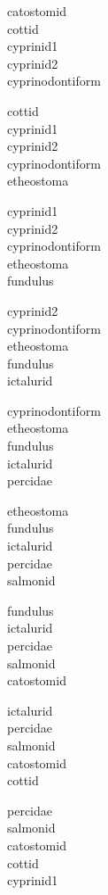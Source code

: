 \documentclass[11pt]{article}
\begin{document}
\thispagestyle{empty}

\begin{multicols*}{3}
	\raggedcolumns
catostomid \\
cottid \\
cyprinid1 \\
cyprinid2 \\
cyprinodontiform \bigskip

cottid \\
cyprinid1 \\
cyprinid2 \\
cyprinodontiform \\
etheostoma \bigskip

cyprinid1 \\
cyprinid2 \\
cyprinodontiform \\
etheostoma \\
fundulus \bigskip

cyprinid2 \\
cyprinodontiform \\
etheostoma \\
fundulus \\
ictalurid \bigskip

cyprinodontiform \\
etheostoma \\
fundulus \\
ictalurid \\
percidae \bigskip

etheostoma \\
fundulus \\
ictalurid \\
percidae \\
salmonid \bigskip

fundulus \\
ictalurid \\
percidae \\
salmonid\\
catostomid 

\columnbreak

ictalurid \\
percidae \\
salmonid\\
catostomid \\
cottid \bigskip

percidae \\
salmonid\\
catostomid \\
cottid \\
cyprinid1 \bigskip


\end{multicols*}
\end{document}

